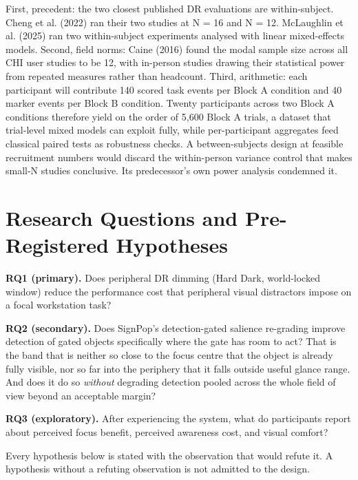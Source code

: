 First, precedent: the two closest published DR evaluations are within-subject. Cheng et al. (2022)
ran their two studies at N = 16 and N = 12. McLaughlin et al. (2025) ran two within-subject
experiments analysed with linear mixed-effects models. Second, field norms: Caine (2016) found the
modal sample size across all CHI user studies to be 12, with in-person studies drawing their
statistical power from repeated measures rather than headcount. Third, arithmetic: each participant
will contribute 140 scored task events per Block A condition and 40 marker events per Block B
condition. Twenty participants across two Block A conditions therefore yield on the order of 5,600
Block A trials, a dataset that trial-level mixed models can exploit fully, while
per-participant aggregates feed classical paired tests as robustness checks. A between-subjects
design at feasible recruitment numbers would discard the within-person variance control that makes
small-N studies conclusive. Its predecessor's own power analysis condemned it.

\section{Research Questions and Pre-Registered Hypotheses}

\textbf{RQ1 (primary).} Does peripheral DR dimming (Hard Dark, world-locked window) reduce the performance
cost that peripheral visual distractors impose on a focal workstation task?

\textbf{RQ2 (secondary).} Does SignPop's detection-gated salience re-grading improve detection of
gated objects specifically where the gate has room to act? That is the band that is neither so close
to the focus centre that the object is already fully visible, nor so far into the periphery that it
falls outside useful glance range. And does it do so \textit{without} degrading detection pooled
across the whole field of view beyond an acceptable margin?

\textbf{RQ3 (exploratory).} After experiencing the system, what do participants report about perceived
focus benefit, perceived awareness cost, and visual comfort?

Every hypothesis below is stated with the observation that would refute it. A hypothesis without a
refuting observation is not admitted to the design.

